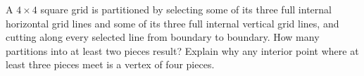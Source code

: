 A $4\times4$ square grid is partitioned by selecting some of its three full internal horizontal grid lines and some of its three full internal vertical grid lines, and cutting along every selected line from boundary to boundary. How many partitions into at least two pieces result? Explain why any interior point where at least three pieces meet is a vertex of four pieces.
